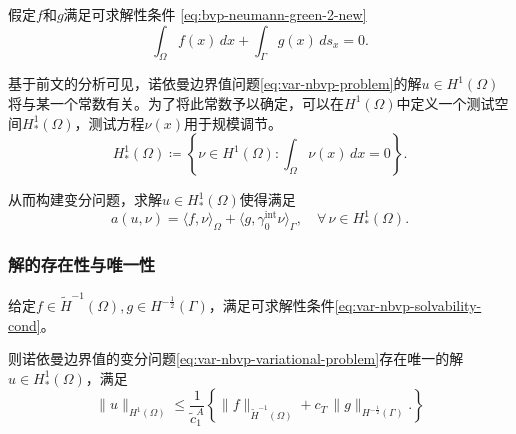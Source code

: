 假定$f$和$g$满足可求解性条件 \eqref{eq:bvp-neumann-green-2-new}
\begin{equation}
  \label{eq:var-nbvp-solvability-cond}
  \int_{\Omega} f(x) \, dx + \int_{\Gamma} g(x) \, d s_x = 0.
\end{equation}

基于前文的分析可见，诺依曼边界值问题\eqref{eq:var-nbvp-problem}的解$u \in H^{1}(\Omega)$将与某一个常数有关。为了将此常数予以确定，可以在$H^{1}(\Omega)$中定义一个测试空间$H_{*}^{1}(\Omega)$，测试方程$\nu(x)$用于规模调节。
\begin{equation}
  \label{eq:var-nbvp-trial-space}
  H_{*}^{1} (\Omega) \coloneqq \left\{ \nu \in H^{1}(\Omega): \int_{\Omega} \nu(x) \, dx = 0 \right\}.
\end{equation}

从而构建变分问题，求解$u \in H_{*}^{1}(\Omega)$使得满足
\begin{equation}
  \label{eq:var-nbvp-variational-problem}
  a(u,\nu) = \langle f, \nu \rangle_{\Omega} + \langle g, \gamma_{0}^{\text{int}} \nu \rangle_{\Gamma}, \quad \forall \, \nu \in H_{*}^{1}(\Omega).
\end{equation}

\subsubsection{解的存在性与唯一性}
\begin{theorem}[诺依曼边界值问题的变分法求解]
  给定$f \in \tilde{H}^{-1}(\Omega), g \in H^{-\frac{1}{2}}(\Gamma)$，满足可求解性条件\eqref{eq:var-nbvp-solvability-cond}。

  则诺依曼边界值的变分问题\eqref{eq:var-nbvp-variational-problem}存在唯一的解$u \in H_{*}^{1}(\Omega)$，满足
  \begin{equation*}
    \big\| u \big\|_{H^{1}(\Omega)} \le \frac{1}{\tilde{c}_1^A}
    \left\{
    \big\| f \big\|_{\widetilde{H}^{-1}(\Omega)} +
    c_{T} \, \big\| g \big\|_{H^{-\frac{1}{2}}(\Gamma)}.
    \right\}
  \end{equation*}
\end{theorem}

